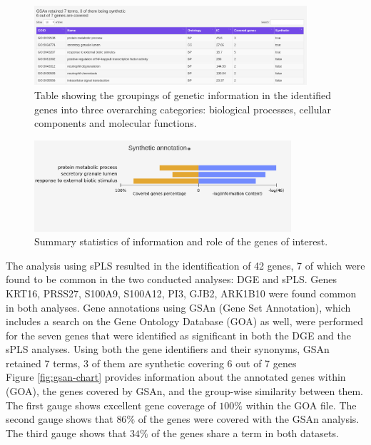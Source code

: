 \documentclass[journal, a4paper]{IEEEtran}
\begin{document}
\begin{figure} %
  \centering
  \includegraphics[width=0.9\textwidth]{gene-ontology.png}
  \caption{Table showing the groupings of genetic information in the identified genes into three overarching categories: biological processes, cellular components and molecular functions.}
  \label{fig:gene-ontology}
\end{figure}


\begin{figure} %
  \centering
  \includegraphics[width=0.85\textwidth]{synthetic-annotation.png}
  \caption{Summary statistics of information and role of the genes of interest.}
  \label{fig:synthetic-annotation}
\end{figure}


The analysis using sPLS resulted in the identification of 42 genes, 7 of which were found to be common in the two conducted analyses: DGE and sPLS. Genes KRT16, PRSS27, S100A9, S100A12, PI3, GJB2, ARK1B10 were found common in both analyses. Gene annotations using GSAn (Gene Set Annotation), which includes a search on the Gene Ontology Database (GOA) as well, were performed for the seven genes that were identified as significant in both the DGE and the sPLS analyses. Using both the gene identifiers and their synonyms, GSAn retained 7 terms, 3 of them are synthetic covering 6 out of 7 genes\\

Figure \ref{fig:gsan-chart} provides information about the annotated genes within (GOA), the genes covered by GSAn, and the group-wise similarity between them. The first gauge shows excellent gene coverage of $100\%$ within the GOA file. The second gauge shows that $86\%$ of the genes were covered with the GSAn analysis. The third gauge shows that $34\%$ of the genes share a term in both datasets.\\
\end{document}
